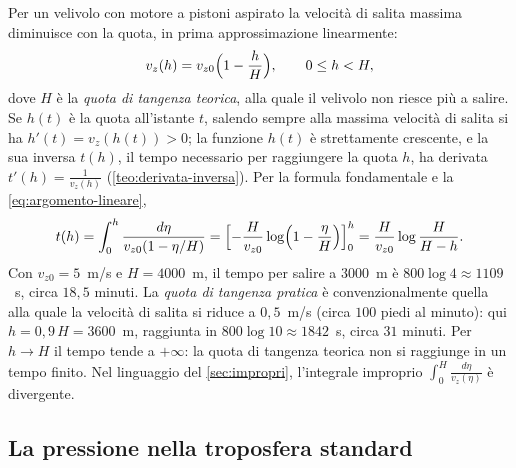 \begin{esempio}\label{es:tempo-salita}
Per un velivolo con motore a pistoni aspirato la velocità di salita massima diminuisce
con la quota, in prima approssimazione linearmente:
\[
  v_{z}(h)=v_{z0}\Bigl(1-\frac hH\Bigr), \qquad 0\le h<H ,
\]
dove $H$ è la \emph{quota di tangenza teorica}, alla quale il velivolo non riesce più a
salire. Se $h(t)$ è la quota all'istante $t$, salendo sempre alla massima velocità di
salita si ha $h'(t)=v_{z}(h(t))>0$; la funzione $h(t)$ è strettamente crescente, e la sua
inversa $t(h)$, il tempo necessario per raggiungere la quota $h$, ha derivata
$t'(h)=\frac1{v_{z}(h)}$ (\cref{teo:derivata-inversa}). Per la formula fondamentale e la
\eqref{eq:argomento-lineare},
\begin{equation}\label{eq:tempo-salita}
  t(h)=\int_{0}^{h}\frac{d\eta}{v_{z0}(1-\eta/H)}
  =\Bigl[-\frac H{v_{z0}}\log\Bigl(1-\frac\eta H\Bigr)\Bigr]_{0}^{h}
  =\frac H{v_{z0}}\log\frac H{H-h} .
\end{equation}
Con $v_{z0}=5$~m/s e $H=4000$~m, il tempo per salire a $3000$~m è
$800\log4\approx1109$~s, circa $18{,}5$ minuti. La \emph{quota di tangenza pratica} è
convenzionalmente quella alla quale la velocità di salita si riduce a $0{,}5$~m/s (circa
$100$ piedi al minuto): qui $h=0{,}9\,H=3600$~m, raggiunta in $800\log10\approx1842$~s,
circa $31$ minuti. Per $h\to H$ il tempo tende a $+\infty$: la quota di tangenza teorica non
si raggiunge in un tempo finito. Nel linguaggio del \cref{sec:impropri}, l'integrale
improprio $\int_{0}^{H}\frac{d\eta}{v_{z}(\eta)}$ è divergente.
\end{esempio}

\subsection{La pressione nella troposfera standard}

